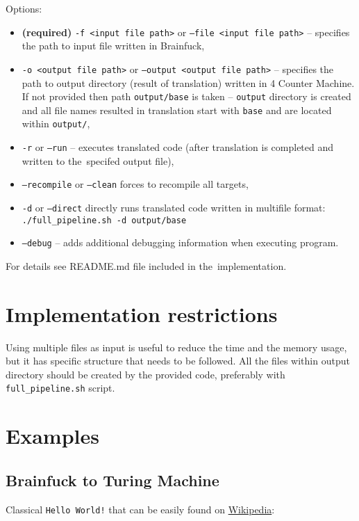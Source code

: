 \documentclass[english,shortabstract,mgr]{iithesis}
\begin{document}
Options:
\begin{itemize}
  \item\textbf{(required)} \texttt{-f <input file path>} or \texttt{--file <input file path>} -- specifies
      the path to input file written in Brainfuck,
  \item \texttt{-o <output file path>} or \texttt{--output <output file path>} -- specifies
      the path to output directory (result of translation) written in 4 Counter Machine. If not
      provided then path \texttt{output/base} is taken -- \texttt{output} directory
      is created and all file names resulted in translation start with \texttt{base}
      and are located within \texttt{output/},
  \item \texttt{-r} or \texttt{--run} -- executes translated code (after translation is completed
      and written to the~specifed output file),
  \item \texttt{--recompile} or \texttt{--clean} forces to recompile all targets,
  \item \texttt{-d} or \texttt{--direct} directly runs translated code written
      in multifile format: \\ \texttt{./full\_pipeline.sh -d output/base}
  \item \texttt{--debug} -- adds additional debugging information when executing program.
\end{itemize}

For details see README.md file included in the~implementation.

\section{Implementation restrictions}

Using multiple files as input is useful to reduce the time and the memory
usage, but it has specific structure that needs to be followed. All the files
within output directory should be created by the provided code, preferably
with \texttt{full\_pipeline.sh} script.

\newpage
\section{Examples}

\subsection{Brainfuck to Turing Machine}

Classical \texttt{Hello World!} that can be easily found on \href{https://pl.wikipedia.org/wiki/Brainfuck#Przyk%C5%82ady}{Wikipedia}:
\end{document}
